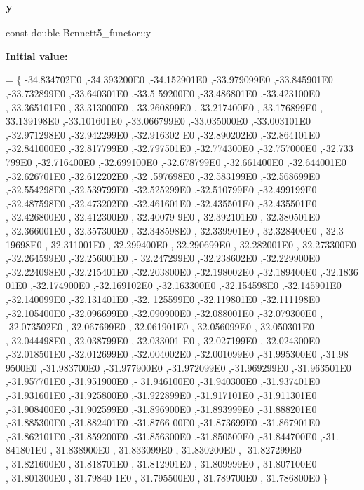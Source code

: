 \subsubsection{\texorpdfstring{y}{y}}
{\footnotesize\ttfamily const double Bennett5\+\_\+functor\+::y\hspace{0.3cm}{\ttfamily [static]}}

{\bfseries Initial value\+:}
\begin{DoxyCode}
= \{ -34.834702E0 ,-34.393200E0 ,-34.152901E0 ,-33.979099E0 ,-33.845901E0 ,-33.732899E0 ,-33.640301E0 ,-33.5
      59200E0 ,-33.486801E0 ,-33.423100E0 ,-33.365101E0 ,-33.313000E0 ,-33.260899E0 ,-33.217400E0 ,-33.176899E0 ,-
      33.139198E0 ,-33.101601E0 ,-33.066799E0 ,-33.035000E0 ,-33.003101E0 ,-32.971298E0 ,-32.942299E0 ,-32.916302
      E0 ,-32.890202E0 ,-32.864101E0 ,-32.841000E0 ,-32.817799E0 ,-32.797501E0 ,-32.774300E0 ,-32.757000E0 ,-32.733
      799E0 ,-32.716400E0 ,-32.699100E0 ,-32.678799E0 ,-32.661400E0 ,-32.644001E0 ,-32.626701E0 ,-32.612202E0 ,-32
      .597698E0 ,-32.583199E0 ,-32.568699E0 ,-32.554298E0 ,-32.539799E0 ,-32.525299E0 ,-32.510799E0 ,-32.499199E0 
      ,-32.487598E0 ,-32.473202E0 ,-32.461601E0 ,-32.435501E0 ,-32.435501E0 ,-32.426800E0 ,-32.412300E0 ,-32.40079
      9E0 ,-32.392101E0 ,-32.380501E0 ,-32.366001E0 ,-32.357300E0 ,-32.348598E0 ,-32.339901E0 ,-32.328400E0 ,-32.3
      19698E0 ,-32.311001E0 ,-32.299400E0 ,-32.290699E0 ,-32.282001E0 ,-32.273300E0 ,-32.264599E0 ,-32.256001E0 ,-
      32.247299E0
,-32.238602E0 ,-32.229900E0 ,-32.224098E0 ,-32.215401E0 ,-32.203800E0 ,-32.198002E0 ,-32.189400E0 ,-32.1836
      01E0 ,-32.174900E0 ,-32.169102E0 ,-32.163300E0 ,-32.154598E0 ,-32.145901E0 ,-32.140099E0 ,-32.131401E0 ,-32.
      125599E0 ,-32.119801E0 ,-32.111198E0 ,-32.105400E0 ,-32.096699E0 ,-32.090900E0 ,-32.088001E0 ,-32.079300E0 ,
      -32.073502E0 ,-32.067699E0 ,-32.061901E0 ,-32.056099E0 ,-32.050301E0 ,-32.044498E0 ,-32.038799E0 ,-32.033001
      E0 ,-32.027199E0 ,-32.024300E0 ,-32.018501E0 ,-32.012699E0 ,-32.004002E0 ,-32.001099E0 ,-31.995300E0 ,-31.98
      9500E0 ,-31.983700E0 ,-31.977900E0 ,-31.972099E0 ,-31.969299E0 ,-31.963501E0 ,-31.957701E0 ,-31.951900E0 ,-
      31.946100E0 ,-31.940300E0 ,-31.937401E0 ,-31.931601E0 ,-31.925800E0 ,-31.922899E0 ,-31.917101E0 ,-31.911301E0
       ,-31.908400E0 ,-31.902599E0 ,-31.896900E0 ,-31.893999E0 ,-31.888201E0 ,-31.885300E0 ,-31.882401E0 ,-31.8766
      00E0 ,-31.873699E0 ,-31.867901E0 ,-31.862101E0 ,-31.859200E0 ,-31.856300E0 ,-31.850500E0 ,-31.844700E0 ,-31.
      841801E0 ,-31.838900E0 ,-31.833099E0 ,-31.830200E0 ,
-31.827299E0 ,-31.821600E0 ,-31.818701E0 ,-31.812901E0 ,-31.809999E0 ,-31.807100E0 ,-31.801300E0 ,-31.79840
      1E0 ,-31.795500E0 ,-31.789700E0 ,-31.786800E0 \}
\end{DoxyCode}


